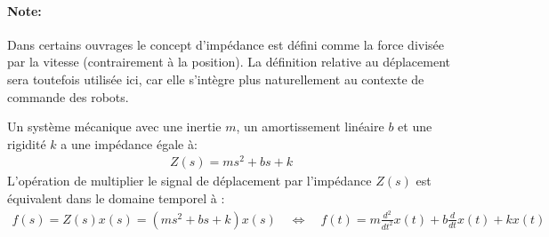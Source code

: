 \paragraph{Note:} Dans certains ouvrages le concept d'impédance est défini comme la force divisée par la vitesse (contrairement à la position). La définition relative au déplacement sera toutefois utilisée ici, car elle s'intègre plus naturellement au contexte de commande des robots.

Un système mécanique avec une inertie $m$, un amortissement linéaire $b$ et une rigidité $k$ a une impédance égale à:
\begin{align}
	Z(s) = m s^2 + b s + k
\end{align}
L'opération de multiplier le signal de déplacement par l'impédance $Z(s)$ est équivalent dans le domaine temporel à :
\begin{align}
	f(s) = Z(s) x(s) = \left( m s^2 + b s + k \right) x(s) \quad \Longleftrightarrow \quad
	f(t) = m \frac{d^2}{dt^2} x(t) + b \frac{d}{dt} x(t) + k x(t)
\end{align}


